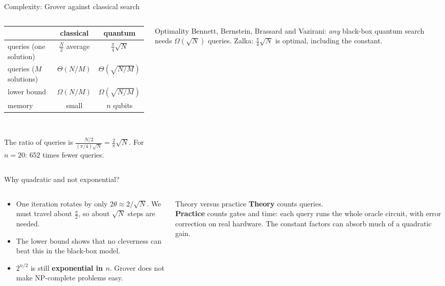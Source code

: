 \documentclass[aspectratio=169,11pt]{beamer}
\newcommand{\hl}[1]{{\color{qorange}\textbf{#1}}}
\newcommand{\key}[1]{{\color{qdark}\textbf{#1}}}
\begin{document}
\begin{frame}{Complexity: Grover against classical search}
  \begin{columns}[T]
    \begin{column}{0.56\textwidth}
      \centering\small
      \begin{tabular}{lcc}
        \toprule
        & classical & quantum\\
        \midrule
        queries (one solution) & $\frac N2$ average & $\frac\pi4\sqrt N$\\
        queries ($M$ solutions) & $\Theta(N/M)$ & $\Theta(\sqrt{N/M})$\\
        lower bound & $\Omega(N/M)$ & $\Omega(\sqrt{N/M})$\\
        memory & small & $n$ qubits\\
        \bottomrule
      \end{tabular}\\[3mm]
      \raggedright\normalsize
      The ratio of queries is $\frac{N/2}{(\pi/4)\sqrt N} = \frac2\pi\sqrt N$. For $n = 20$: $652$ times fewer queries.
    \end{column}
    \begin{column}{0.4\textwidth}
      \begin{block}{Optimality}
        Bennett, Bernstein, Brassard and Vazirani: \emph{any} black-box quantum search needs $\Omega(\sqrt N)$ queries. Zalka: $\frac\pi4\sqrt N$ is optimal, including the constant.
      \end{block}
    \end{column}
  \end{columns}
\end{frame}

\begin{frame}{Why quadratic and not exponential?}
  \begin{columns}[T]
    \begin{column}{0.5\textwidth}
      \begin{itemize}
        \item One iteration rotates by only $2\theta \approx 2/\sqrt N$. We must travel about $\frac\pi2$, so about $\sqrt N$ steps are needed.
        \item The lower bound shows that no cleverness can beat this in the black-box model.
        \item $2^{n/2}$ is still \hl{exponential in $n$}. Grover does not make NP-complete problems easy.
      \end{itemize}
    \end{column}
    \begin{column}{0.46\textwidth}
      \begin{alertblock}{Theory versus practice}
        \key{Theory} counts queries.\\[1mm]
        \key{Practice} counts gates and time: each query runs the whole oracle circuit, with error correction on real hardware. The constant factors can absorb much of a quadratic gain.
      \end{alertblock}
    \end{column}
  \end{columns}
\end{frame}
\end{document}
